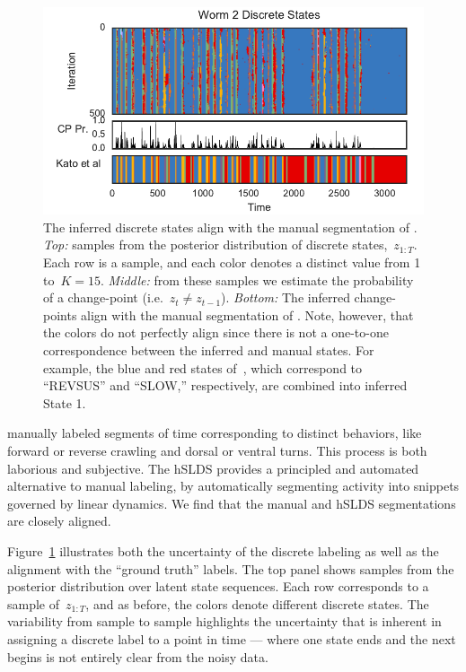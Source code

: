 \documentclass{article}
\begin{document}
\begin{figure}[t]
\centering%
\includegraphics[width=5.5in]{discrete_state_cps_worm1.pdf} 
\caption{The inferred discrete states align with the manual segmentation
  of \citet{kato2015global}. \textit{Top:} samples from the posterior
  distribution of discrete states,~$z_{1:T}$. Each row is a sample, and
  each color denotes a distinct value from 1 to~$K=15$. \textit{Middle:}
  from these samples we estimate the probability of a change-point
  (i.e.~$z_t \neq z_{t-1}$). \textit{Bottom:} The inferred change-points
  align with the manual segmentation of \citet{kato2015global}. Note,
  however, that the colors do not perfectly align since there is not a
  one-to-one correspondence between the inferred and manual states. For
  example, the blue and red states of~\citet{kato2015global}, which
  correspond to ``REVSUS'' and ``SLOW,'' respectively, are combined into
  inferred State 1.
}
\label{fig:discrete_state_comparison}
\end{figure}

\citet{kato2015global} manually labeled segments of time corresponding to
distinct behaviors, like forward or reverse crawling and dorsal or ventral
turns. This process is both laborious and subjective. The hSLDS provides
a principled and automated alternative to manual labeling, by automatically
segmenting activity into snippets governed by linear dynamics. We find that
the manual and hSLDS segmentations are closely aligned.

Figure~\ref{fig:discrete_state_comparison} illustrates both the uncertainty
of the discrete labeling as well as the alignment with the ``ground truth''
labels. The top panel shows samples from the posterior distribution over
latent state sequences. Each row corresponds to a sample of~$z_{1:T}$, and
as before, the colors denote different discrete states. The variability
from sample to sample highlights the uncertainty that is inherent in assigning
a discrete label to a point in time --- where one state ends and the next
begins is not entirely clear from the noisy data.
\end{document}
